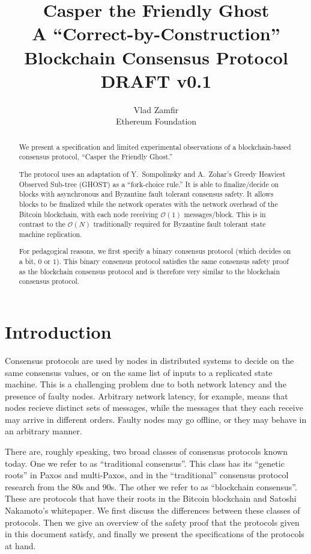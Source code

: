 \documentclass{article}
\theoremstyle{definition}
\begin{document}
\title{ Casper the Friendly Ghost \\ \Large{A ``Correct-by-Construction'' Blockchain Consensus Protocol} \\ \vspace{5mm} \small{DRAFT v0.1}}
\author{Vlad Zamfir \\ Ethereum Foundation}
\maketitle

\begin{abstract}
We present a specification and limited experimental observations of a blockchain-based consensus protocol, ``Casper the Friendly Ghost.''

The protocol uses an adaptation of Y.\ Sompolinsky and A.\ Zohar's Greedy Heaviest Observed Sub-tree (GHOST) \cite{GHOST} as a ``fork-choice rule.'' It is able to finalize/decide on blocks with asynchronous and Byzantine fault tolerant consensus safety. It allows blocks to be finalized while the network operates with the network overhead of the Bitcoin blockchain, with each node receiving $\mathcal{O}(1)$ messages/block. This is in contrast to the $\mathcal{O}(N)$ traditionally required for Byzantine fault tolerant state machine replication.

For pedagogical reasons, we first specify a binary consensus protocol (which decides on a bit, $0$ or $1$). This binary consensus protocol satisfies the same consensus safety proof as the blockchain consensus protocol and is therefore very similar to the blockchain consensus protocol.

\end{abstract}

\section{Introduction}

Consensus protocols are used by nodes in distributed systems to decide on the same consensus values, or on the same list of inputs to a replicated state machine. This is a challenging problem due to both network latency and the presence of faulty nodes. Arbitrary network latency, for example, means that nodes recieve distinct sets of messages, while the messages that they each receive may arrive in different orders. Faulty nodes may go offline, or they may behave in an arbitrary manner.

There are, roughly speaking, two broad classes of consensus protocols known today. One we refer to as ``traditional consensus''. This class has its ``genetic roots'' in Paxos and multi-Paxos, and in the ``traditional'' consensus protocol research from the 80s and 90s\cite{lamport_1998}. The other we refer to as ``blockchain consensus''. These are protocols that have their roots in the Bitcoin blockchain and Satoshi Nakamoto's whitepaper\cite{nakamoto}. We first discuss the differences between these classes of protocols. Then we give an overview of the safety proof that the protocols given in this document satisfy, and finally we present the specifications of the protocols at hand.
\end{document}
